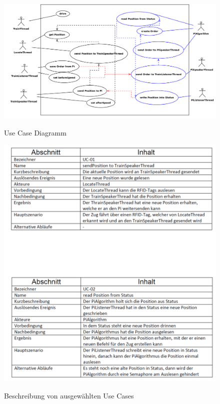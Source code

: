 \begin{figure}[H]	
\caption{Use Case Diagramm}
\includegraphics[width=2\textwidth, width=465pt]{content/images/UseCaseDia.png}
\label{pic:UseCaseDiagram}
\end{figure}

\begin{figure}[H]	
\caption{Beschreibung von ausgewählten Use Cases}
\includegraphics[width=2\textwidth, width=445pt]{content/images/UseCase1.png}
\label{pic:UseCase1}
\end{figure}

